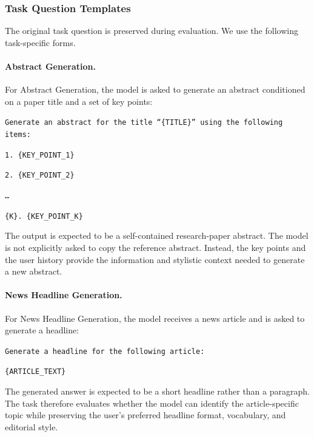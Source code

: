 \documentclass{article} %
\begin{document}
\subsubsection{Task Question Templates}

The original task question is preserved during evaluation. We use the following task-specific forms.

\paragraph{Abstract Generation.}
For Abstract Generation, the model is asked to generate an abstract conditioned on a paper title and a set of key points:

\begin{tcolorbox}[
    colback=gray!5,
    colframe=black!45,
    title=Abstract Generation question template,
    breakable,
    left=3pt,
    right=3pt,
    top=3pt,
    bottom=3pt
]
\small
\texttt{Generate an abstract for the title ``\{TITLE\}'' using the following items:}

\texttt{1. \{KEY\_POINT\_1\}}

\texttt{2. \{KEY\_POINT\_2\}}

\texttt{\ldots}

\texttt{\{K\}. \{KEY\_POINT\_K\}}
\end{tcolorbox}

The output is expected to be a self-contained research-paper abstract. The model is not explicitly asked to copy the reference abstract. Instead, the key points and the user history provide the information and stylistic context needed to generate a new abstract.

\paragraph{News Headline Generation.}
For News Headline Generation, the model receives a news article and is asked to generate a headline:

\begin{tcolorbox}[
    colback=gray!5,
    colframe=black!45,
    title=News Headline Generation question template,
    breakable,
    left=3pt,
    right=3pt,
    top=3pt,
    bottom=3pt
]
\small
\texttt{Generate a headline for the following article:}

\texttt{\{ARTICLE\_TEXT\}}
\end{tcolorbox}

The generated answer is expected to be a short headline rather than a paragraph. The task therefore evaluates whether the model can identify the article-specific topic while preserving the user's preferred headline format, vocabulary, and editorial style.
\end{document}
